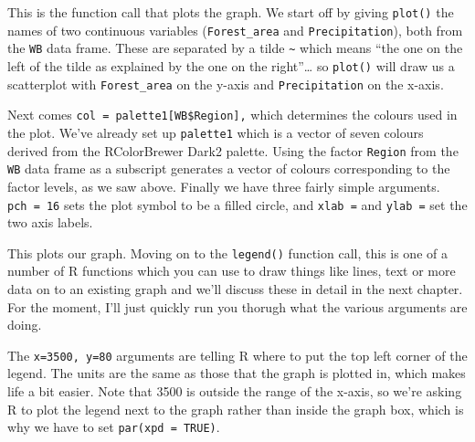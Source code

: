 \documentclass[
]{book}
\newenvironment{Shaded}{\begin{snugshade}}{\end{snugshade}}
\newcommand{\DataTypeTok}[1]{\textcolor[rgb]{0.13,0.29,0.53}{#1}}
\newcommand{\DecValTok}[1]{\textcolor[rgb]{0.00,0.00,0.81}{#1}}
\newcommand{\KeywordTok}[1]{\textcolor[rgb]{0.13,0.29,0.53}{\textbf{#1}}}
\newcommand{\NormalTok}[1]{#1}
\newcommand{\OperatorTok}[1]{\textcolor[rgb]{0.81,0.36,0.00}{\textbf{#1}}}
\newcommand{\StringTok}[1]{\textcolor[rgb]{0.31,0.60,0.02}{#1}}
\begin{document}
This is the function call that plots the graph. We start off by giving \texttt{plot()} the names of two continuous variables (\texttt{Forest\_area} and \texttt{Precipitation}), both from the \texttt{WB} data frame. These are separated by a tilde \texttt{\textasciitilde{}} which means ``the one on the left of the tilde as explained by the one on the right''\ldots{} so \texttt{plot()} will draw us a scatterplot with \texttt{Forest\_area} on the y-axis and \texttt{Precipitation} on the x-axis.

Next comes \texttt{col\ =\ palette1{[}WB\$Region{]},} which determines the colours used in the plot. We've already set up \texttt{palette1} which is a vector of seven colours derived from the RColorBrewer Dark2 palette. Using the factor \texttt{Region} from the \texttt{WB} data frame as a subscript generates a vector of colours corresponding to the factor levels, as we saw above. Finally we have three fairly simple arguments. \texttt{pch\ =\ 16} sets the plot symbol to be a filled circle, and \texttt{xlab\ =} and \texttt{ylab\ =} set the two axis labels.

This plots our graph. Moving on to the \texttt{legend()} function call, this is one of a number of R functions which you can use to draw things like lines, text or more data on to an existing graph and we'll discuss these in detail in the next chapter. For the moment, I'll just quickly run you thorugh what the various arguments are doing.

\begin{Shaded}
\end{Shaded}

The \texttt{x=3500,\ y=80} arguments are telling R where to put the top left corner of the legend. The units are the same as those that the graph is plotted in, which makes life a bit easier. Note that 3500 is outside the range of the x-axis, so we're asking R to plot the legend next to the graph rather than inside the graph box, which is why we have to set \texttt{par(xpd\ =\ TRUE)}.
\end{document}
